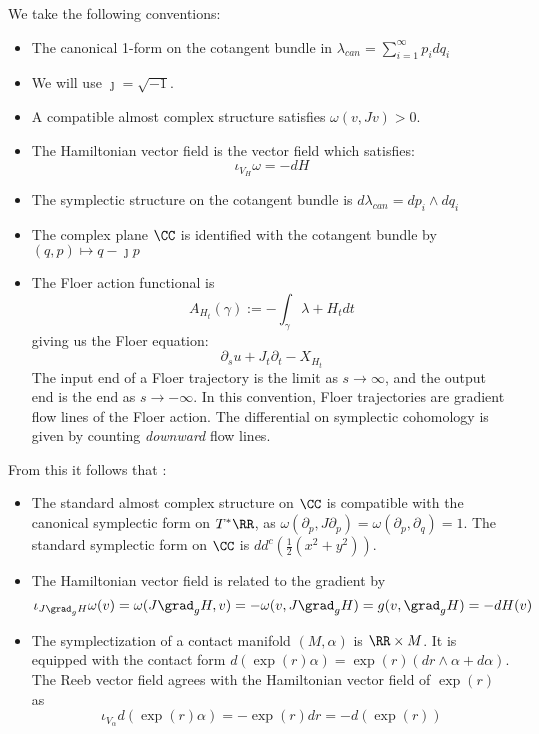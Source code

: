 
\begin{convention}
We take the following conventions:
\begin{itemize}
    \item The canonical 1-form on the cotangent bundle in $\lambda_{can}=\sum_{i=1}^\infty p_i dq_i$
    \item We will use $\jmath=\sqrt{-1}$.
    \item A compatible almost complex structure satisfies $\omega(v, Jv)>0$.
    \item The Hamiltonian vector field  is the vector field which satisfies:
    \[\iota_{V_H}\omega = - dH\]
    \item The symplectic structure on the cotangent bundle is $d\lambda_{can}=dp_i\wedge dq_i$
    \item The complex plane $\CC$ is identified with the cotangent bundle by $(q, p)\mapsto q-\jmath p$
    \item The Floer action functional is 
    \[A_{H_t}(\gamma):=-\int_\gamma \lambda+ H_t dt\]
    giving us the Floer equation:
    \[\partial_su +J_t \partial_t -X_{H_t}\]
    The input end of a Floer trajectory is the limit as $s\to\infty$, and the output end is the end as $s\to-\infty$. In this convention, Floer trajectories are gradient flow lines of the Floer action. The differential on symplectic cohomology is given by counting \emph{downward} flow lines.
\end{itemize}
From this it follows that :
\begin{itemize}
    \item The standard almost complex structure on $\CC$ is compatible with the canonical symplectic form on $T^*\RR$, as $\omega(\partial_p, J\partial_p) = \omega(\partial_p, \partial_q) = 1$. The standard symplectic form on $\CC$ is $d d^c\left( \frac{1}{2}(x^2+y^2)\right)$.
    \item The Hamiltonian vector field is related to the gradient by
    \[\iota_{J\grad_g H}\omega(v)=\omega(J\grad_gH, v)= -\omega(v,J\grad_gH)=g(v, \grad_gH)=-dH(v)\] 
    \item The symplectization of a contact manifold $(M, \alpha)$ is $\RR\times M$. It is equipped with the contact form $d(\exp(r) \alpha)= \exp(r) (dr \wedge \alpha + d\alpha)$. The Reeb vector field agrees with the Hamiltonian vector field of $\exp(r)$ as
    \[ \iota_{V_\alpha}d(\exp(r)\alpha)=-\exp(r) dr = -d(\exp(r))\]
\end{itemize}

\end{convention}